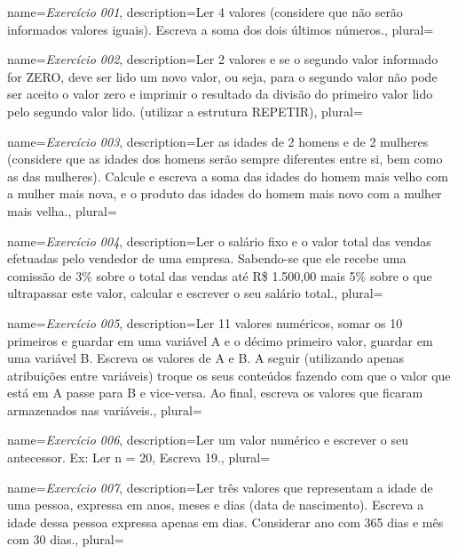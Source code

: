 

\glsenableentrycount


{
	name={\textit{Exercício 001}},
	description={Ler 4 valores (considere que não serão informados valores iguais). Escreva a soma dos dois últimos números.},
	plural={}
}



{
	name={\textit{Exercício 002}},
	description={Ler 2 valores e se o segundo valor informado for ZERO, deve ser lido um novo valor, ou seja, para o segundo valor não pode ser aceito o valor zero e imprimir o resultado da divisão do primeiro valor lido pelo segundo valor lido. (utilizar a estrutura REPETIR)},
	plural={}
}


{
	name={\textit{Exercício 003}},
	description={Ler as idades de 2 homens e de 2 mulheres (considere que as idades dos homens serão sempre diferentes entre si, bem como as das mulheres). Calcule e escreva a soma das idades do homem mais velho com a mulher mais nova, e o produto das idades do homem mais novo com a mulher mais velha.},
	plural={}
}



{
	name={\textit{Exercício 004}},
	description={Ler o salário fixo e o valor total das vendas efetuadas pelo vendedor de uma empresa. Sabendo-se que ele recebe uma comissão de 3\% sobre o total das vendas até R\$ 1.500,00 mais 5\% sobre  o que ultrapassar este valor, calcular e escrever o seu salário total.},
	plural={}
}

{
	name={\textit{Exercício 005}},
	description={Ler 11 valores numéricos, somar os 10 primeiros e guardar em uma variável A e o décimo	primeiro valor, guardar em uma variável B. Escreva os valores de A e B. A seguir (utilizando apenas atribuições entre variáveis) troque os seus conteúdos fazendo com que o valor que está em A passe para B e vice-versa. Ao final, escreva os valores que ficaram	armazenados nas variáveis.},
	plural={}
}

{
	name={\textit{Exercício 006}},
	description={Ler um valor numérico e escrever o seu antecessor. Ex: Ler n = 20, Escreva 19.},
	plural={}
}


{
	name={\textit{Exercício 007}},
	description={Ler três valores que representam a idade de uma pessoa, expressa em anos, meses e dias (data de nascimento).	Escreva a idade dessa pessoa expressa apenas em dias. Considerar ano com 365 dias e mês	com 30 dias.},
	plural={}
}


